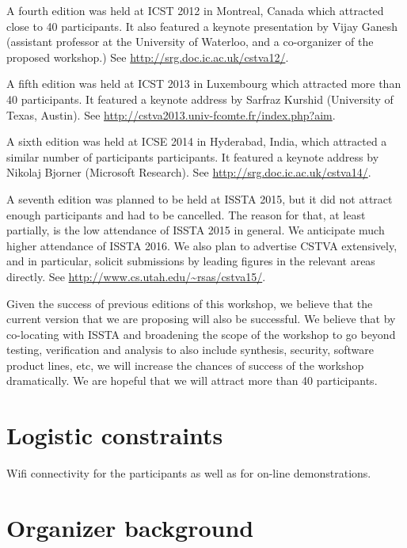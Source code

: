 \documentclass{sig-alternate}
\begin{document}
A fourth edition was held at ICST 2012 in Montreal, Canada which attracted
close to 40 participants. It also featured a keynote presentation by Vijay
Ganesh (assistant professor at the University of Waterloo, and a co-organizer
of the proposed workshop.) 
See \url{http://srg.doc.ic.ac.uk/cstva12/}.

A fifth edition was held at ICST 2013 in Luxembourg which attracted more than
40 participants. It featured a keynote address by Sarfraz Kurshid (University
of Texas, Austin). 
See \url{http://cstva2013.univ-fcomte.fr/index.php?aim}.

A sixth edition was held at ICSE 2014 in Hyderabad, India, which attracted a
similar number of participants participants. It featured a keynote address by
Nikolaj Bjorner (Microsoft Research). 
See \url{http://srg.doc.ic.ac.uk/cstva14/}.

A seventh edition was planned to be held at ISSTA 2015, but it did not attract
enough participants and had to be cancelled. The reason for that, at least partially, is the low attendance of ISSTA 2015 in general.
We anticipate much higher attendance of ISSTA 2016.
 We also plan to advertise CSTVA extensively, and in particular, 
solicit submissions by leading figures in the relevant areas directly.
See \url{http://www.cs.utah.edu/~rsas/cstva15/}.

Given the success of previous editions of this workshop, we believe that the
current version that we are proposing will also be successful. We believe that
by co-locating with ISSTA and broadening the scope of the workshop to go beyond
testing, verification and analysis to also include synthesis, security,
software product lines, etc, we will increase the chances of success of the
workshop dramatically. We are hopeful that we will attract more than 40
participants. 

\section{Logistic constraints}

Wifi connectivity for the participants as well as for on-line demonstrations.

\section{Organizer background}
\end{document}
